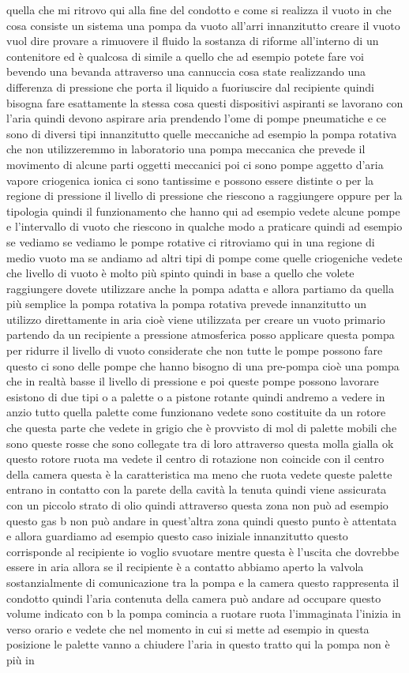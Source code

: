 quella che mi ritrovo qui alla fine del condotto e come si realizza il vuoto in che cosa consiste un sistema una pompa da vuoto all'arri innanzitutto creare il vuoto vuol dire provare a rimuovere il fluido la sostanza di riforme all'interno di un contenitore ed è qualcosa di simile a quello che ad esempio potete fare voi bevendo una bevanda attraverso una cannuccia cosa state realizzando una differenza di pressione che porta il liquido a fuoriuscire dal recipiente quindi bisogna fare esattamente la stessa cosa questi dispositivi aspiranti se lavorano con l'aria quindi devono aspirare aria prendendo l'ome di pompe pneumatiche e ce sono di diversi tipi innanzitutto quelle meccaniche ad esempio la pompa rotativa che non utilizzeremmo in laboratorio una pompa meccanica che prevede il movimento di alcune parti oggetti meccanici poi ci sono pompe aggetto d'aria vapore criogenica ionica ci sono tantissime e possono essere distinte o per la regione di pressione il livello di pressione che riescono a raggiungere oppure per la tipologia quindi il funzionamento che hanno qui ad esempio vedete alcune pompe e l'intervallo di vuoto che riescono in qualche modo a praticare quindi ad esempio se vediamo se vediamo le pompe rotative ci ritroviamo qui in una regione di medio vuoto ma se andiamo ad altri tipi di pompe come quelle criogeniche vedete che livello di vuoto è molto più spinto quindi in base a quello che volete raggiungere dovete utilizzare anche la pompa adatta e allora partiamo da quella più semplice la pompa rotativa la pompa rotativa prevede innanzitutto un utilizzo direttamente in aria cioè viene utilizzata per creare un vuoto primario partendo da un recipiente a pressione atmosferica posso applicare questa pompa per ridurre il livello di vuoto considerate che non tutte le pompe possono fare questo ci sono delle pompe che hanno bisogno di una pre-pompa cioè una pompa che in realtà basse il livello di pressione e poi queste pompe possono lavorare esistono di due tipi o a palette o a pistone rotante quindi andremo a vedere in anzio tutto quella palette come funzionano vedete sono costituite da un rotore che questa parte che vedete in grigio che è provvisto di mol di palette mobili che sono queste rosse che sono collegate tra di loro attraverso questa molla gialla ok questo rotore ruota ma vedete il centro di rotazione non coincide con il centro della camera questa è la caratteristica ma meno che ruota vedete queste palette entrano in contatto con la parete della cavità la tenuta quindi viene assicurata con un piccolo strato di olio quindi attraverso questa zona non può ad esempio questo gas b non può andare in quest'altra zona quindi questo punto è attentata e allora guardiamo ad esempio questo caso iniziale innanzitutto questo corrisponde al recipiente io voglio svuotare mentre questa è l'uscita che dovrebbe essere in aria allora se il recipiente è a contatto abbiamo aperto la valvola sostanzialmente di comunicazione tra la pompa e la camera questo rappresenta il condotto quindi l'aria contenuta della camera può andare ad occupare questo volume indicato con b la pompa comincia a ruotare ruota l'immaginata l'inizia in verso orario e vedete che nel momento in cui si mette ad esempio in questa posizione le palette vanno a chiudere l'aria in questo tratto qui la pompa non è più in 